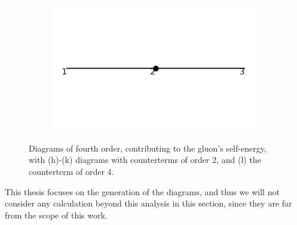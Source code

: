 \documentclass[11pt,a4paper,twoside,pdf]{article}
\numberwithin{equation}{section}
\begin{document}
\begin{figure}[h!]
\begin{subfigure}[t]{0.19\textwidth}
    \end{subfigure}
    \begin{subfigure}[t]{0.19\textwidth}
        \centering
        \includegraphics[width=\textwidth]{plots/order4_1to1/counterterms/6.png}
        \caption{ }
        
    \end{subfigure}

    \caption{Diagrams of fourth order, contributing to the gluon's self-energy,
    with (h)-(k) diagrams with counterterms of order 2, and (l) the counterterm 
    of order 4.}
    \label{fig:order4_1to1}
    
\end{figure}

This thesis focuses on the generation of the diagrams, and thus we will not
consider any calculation beyond this analysis in this section, since
they are far from the scope of this work.
\end{document}
